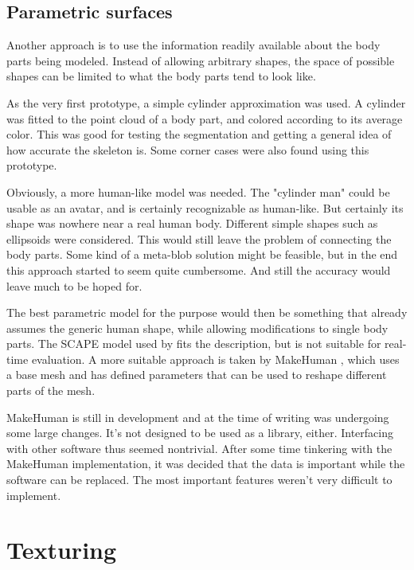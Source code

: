 \subsection{Parametric surfaces}

Another approach is to use the information readily available about the body parts being modeled. Instead of allowing arbitrary shapes, the space of possible shapes can be limited to what the body parts tend to look like.

As the very first prototype, a simple cylinder approximation was used. A cylinder was fitted to the point cloud of a body part, and colored according to its average color. This was good for testing the segmentation and getting a general idea of how accurate the skeleton is. Some corner cases were also found using this prototype.

Obviously, a more human-like model was needed. The "cylinder man" could be usable as an avatar, and is certainly recognizable as human-like. But certainly its shape was nowhere near a real human body. Different simple shapes such as ellipsoids were considered. This would still leave the problem of connecting the body parts. Some kind of a meta-blob solution might be feasible, but in the end this approach started to seem quite cumbersome. And still the accuracy would leave much to be hoped for.

The best parametric model for the purpose would then be something that already assumes the generic human shape, while allowing  modifications to single body parts. The SCAPE model \citep{anguelov2005scape} used by \citet{weiss2011home} fits the description, but is not suitable for real-time evaluation. A more suitable approach is taken by MakeHuman \citep{makehuman}, which uses a base mesh and has defined parameters that can be used to reshape different parts of the mesh.

MakeHuman is still in development and at the time of writing was undergoing some large changes. It's not designed to be used as a library, either. Interfacing with other software thus seemed nontrivial. After some time tinkering with the MakeHuman implementation, it was decided that the data is important while the software can be replaced. The most important features weren't very difficult to implement.


\section{Texturing}



